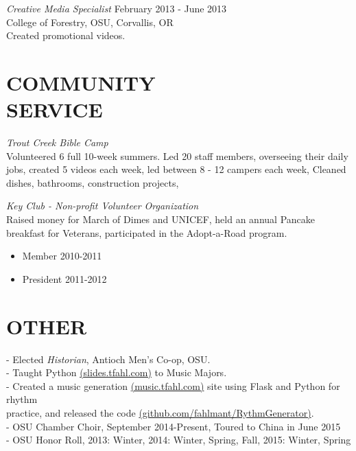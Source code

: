\documentclass[line,margin]{res}
\begin{document}
\begin{resume}
                    {\sl Creative Media Specialist} \hfill February 2013 - June 2013 \\
                    College of Forestry, OSU,
                    Corvallis, OR\\
                    Created promotional videos.
 
\section{COMMUNITY \\ SERVICE}  
                {\sl Trout Creek Bible Camp\\}
                    Volunteered 6 full 10-week summers.
                    Led 20 staff members, overseeing their daily jobs,
                    created 5 videos each week,
                    led between 8 - 12 campers each week,
                    Cleaned dishes, bathrooms, construction projects,

                {\sl Key Club - Non-profit Volunteer Organization\\}
                    Raised money for March of Dimes and UNICEF, held an annual Pancake breakfast
                    for Veterans, participated in the Adopt-a-Road program.
                    \begin{itemize}  \itemsep -2pt %
                        \item Member 2010-2011
                        \item President 2011-2012
                    \end{itemize}

\section{OTHER\\}             
                - Elected {\it Historian}, Antioch Men's Co-op, OSU. \\
                - Taught Python \href{http://slides.tfahl.com/python-lessons/}{(slides.tfahl.com)} to Music Majors. \\
                - Created a music generation \href{http://music.tfahl.com}{(music.tfahl.com)} 
                      site using Flask and Python for rhythm\\ 
                      practice, and released the code 
                      \href{https://github.com/fahlmant/RhythmGenerator}{(github.com/fahlmant/RythmGenerator)}.\\
                - OSU Chamber Choir, September 2014-Present, Toured to China in June 2015\\
                - OSU Honor Roll, 2013: Winter, 2014: Winter, Spring, Fall, 2015: Winter, Spring\\

\end{resume}
\end{document}
